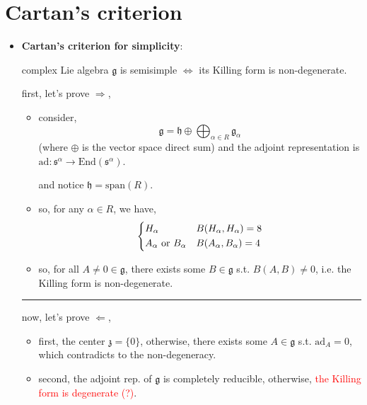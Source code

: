 \section{Cartan's criterion}
\begin{itemize}
	\item \textbf{Cartan's criterion for simplicity}:
	
	complex Lie algebra $\mathfrak{g}$ is semisimple $\iff$ its Killing form is non-degenerate.
	
	\begin{tcolorbox}[title=proof:]
		first, let's prove $\Longrightarrow$,
		\begin{itemize}
			\item consider,
			\begin{equation}
				\mathfrak{g} = \mathfrak{h} \oplus \bigoplus_{\alpha \in R} \mathfrak{g}_\alpha
			\end{equation}
			(where $\oplus$ is the vector space direct sum) and the adjoint representation is $\mathrm{ad} : \mathfrak{s}^\alpha \rightarrow \mathrm{End}(\mathfrak{s}^\alpha)$.
			
			and notice $\mathfrak{h} = \mathrm{span}(R)$.
			
			\item so, for any $\alpha \in R$, we have,
			\begin{equation}
				\begin{dcases}
					H_\alpha & B(H_\alpha, H_\alpha) = 8 \\
					A_\alpha \ \text{or} \ B_\alpha & B(A_\alpha, B_\alpha) = 4
				\end{dcases}
			\end{equation}
			
			\item so, for all $A \neq 0 \in \mathfrak{g}$, there exists some $B \in \mathfrak{g}$ s.t. $B(A, B) \neq 0$, i.e. the Killing form is non-degenerate.
		\end{itemize}
		
		\noindent\rule[0.5ex]{\linewidth}{0.5pt} %
		
		now, let's prove $\Longleftarrow$,
		\begin{itemize}
			\item first, the center $\mathfrak{z} = \{0\}$, otherwise, there exists some $A \in \mathfrak{g}$ s.t. $\mathrm{ad}_A = 0$, which contradicts to the non-degeneracy.
			
			\item second, the adjoint rep. of $\mathfrak{g}$ is completely reducible, otherwise, \textcolor{red}{the Killing form is degenerate (?)}.
		\end{itemize}
	\end{tcolorbox}
\end{itemize}


